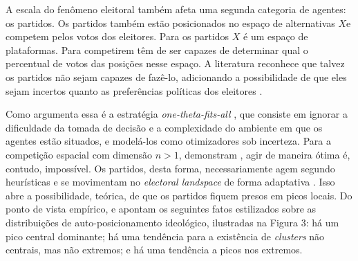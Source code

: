 A escala do fenômeno eleitoral também afeta uma segunda categoria de agentes: os
partidos. Os partidos também estão posicionados no espaço de alternativas \(X\)e
competem pelos votos dos eleitores. Para os partidos \(X\) é um espaço de
plataformas. Para competirem têm de ser capazes de determinar qual o percentual
de votos das posições nesse espaço. A literatura reconhece que talvez os
partidos não sejam capazes de fazê-lo, adicionando a possibilidade de que eles
sejam incertos quanto as preferências políticas dos eleitores
\cite{glazer1989model, grofman2004downs}.


Como argumenta  essa é a estratégia
\textit{one-theta-fits-all} , que consiste em ignorar a dificuldade da tomada de
decisão e a complexidade do ambiente em que os agentes estão situados, e
modelá-los como otimizadores sob incerteza. Para a competição espacial com
dimensão $n>1$, demonstram , agir de maneira
ótima é, contudo, impossível. Os partidos, desta forma, necessariamente agem
segundo heurísticas e se movimentam no \textit{electoral landspace} de forma
adaptativa \cite{kollman1998political, de1999adaptive}. Isso abre a
possibilidade, teórica, de que os partidos fiquem presos em picos locais. Do
ponto de vista empírico,  e
 apontam os seguintes fatos estilizados sobre as
distribuições de auto-posicionamento ideológico, ilustradas na Figura 3: há um
pico central dominante; há uma tendência para a existência de \textit{clusters}
não centrais, mas não extremos; e há uma tendência a picos nos extremos.

